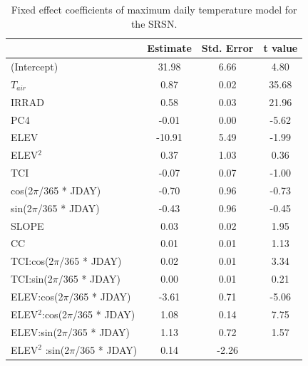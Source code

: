 \documentclass{ametsoc}
\begin{document}
\begin{table}[t]
\caption{Fixed effect coefficients of maximum daily temperature model for the SRSN.}
\begin{center}
\begin{tabular}{lccc}
\hline\hline
                                                 & Estimate & Std. Error & t value \\
\hline
(Intercept)                      & 31.98    & 6.66       & 4.80    \\
$T_{air}$                        & 0.87     & 0.02       & 35.68   \\
IRRAD                            & 0.58     & 0.03       & 21.96   \\
PC4                              & -0.01    & 0.00       & -5.62   \\
ELEV                             & -10.91   & 5.49       & -1.99   \\
ELEV$^2$                         & 0.37     & 1.03       & 0.36    \\
TCI                              & -0.07    & 0.07       & -1.00   \\
cos(2$\pi$/365 * JDAY)           & -0.70    & 0.96       & -0.73   \\
sin(2$\pi$/365 * JDAY)           & -0.43    & 0.96       & -0.45   \\
SLOPE                            & 0.03     & 0.02       & 1.95    \\
CC                               & 0.01     & 0.01       & 1.13    \\
TCI:cos(2$\pi$/365 * JDAY)       & 0.02     & 0.01       & 3.34    \\
TCI:sin(2$\pi$/365 * JDAY)       & 0.00     & 0.01       & 0.21    \\
ELEV:cos(2$\pi$/365 * JDAY)      & -3.61    & 0.71       & -5.06   \\
ELEV$^2$:cos(2$\pi$/365 * JDAY)  & 1.08     & 0.14       & 7.75    \\
ELEV:sin(2$\pi$/365 * JDAY)      & 1.13     & 0.72       & 1.57    \\
ELEV$^2$ :sin(2$\pi$/365 * JDAY) & 0.14       & -2.26   \\
\hline
\end{tabular}
\end{center}
\end{table}
\end{document}
